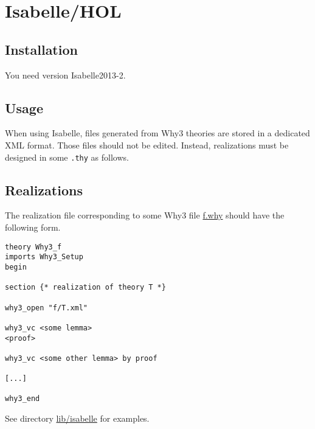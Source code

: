 \section{Isabelle/HOL}
\label{sec:isabelle}


\subsection{Installation}

You need version Isabelle2013-2.


\subsection{Usage}


When using Isabelle, files generated from Why3 theories are stored in
a dedicated XML format. Those files should not be edited. Instead,
realizations must be designed in some \texttt{.thy} as follows. 

\subsection{Realizations}

The realization file corresponding to some Why3 file \url{f.why}
should have the following form. 
\begin{verbatim}
theory Why3_f
imports Why3_Setup
begin

section {* realization of theory T *}

why3_open "f/T.xml"

why3_vc <some lemma> 
<proof>

why3_vc <some other lemma> by proof

[...]

why3_end
\end{verbatim}


See directory \url{lib/isabelle} for examples.


